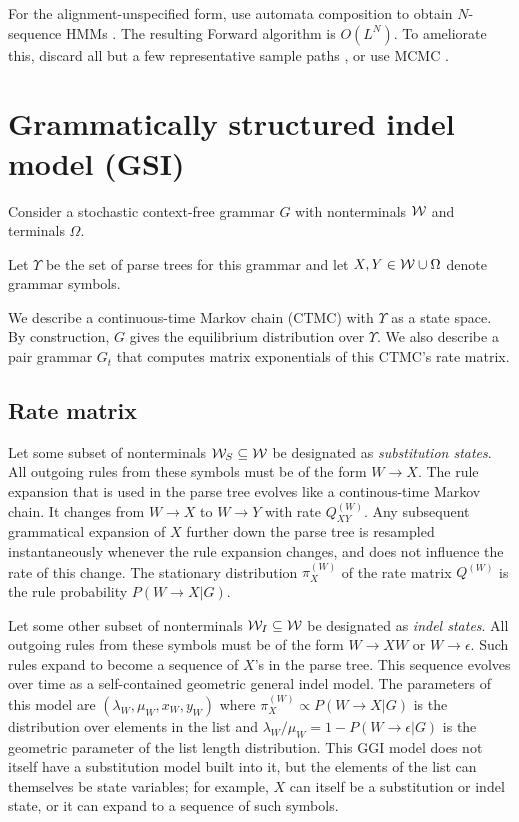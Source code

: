\documentclass{article}
\begin{document}
For the alignment-unspecified form, use automata composition to obtain $N$-sequence HMMs \cite{SilvestreRyanEtAl2020}.
The resulting Forward algorithm is $O(L^N)$.
To ameliorate this, discard all but a few representative sample paths \cite{WestessonEtAl2012},
or use MCMC \cite{RedelingsSuchard2007}.


\section{Grammatically structured indel model (GSI)}

Consider a stochastic context-free grammar $G$
with nonterminals ${\cal W}$ and terminals $\Omega$.

Let $\Upsilon$ be the set of parse trees for this grammar
and let $X,Y \in {\cal W}\cup\Omega$ denote grammar symbols.

We describe a continuous-time Markov chain (CTMC) with $\Upsilon$ as a state space.
By construction, $G$ gives the equilibrium distribution over $\Upsilon$.
We also describe a pair grammar $G_t$ that computes matrix exponentials of this CTMC's rate matrix.

\subsection{Rate matrix}

Let some subset of nonterminals ${\cal W}_S \subseteq {\cal W}$ be designated as {\em substitution states}.
All outgoing rules from these symbols must be of the form $W \to X$.
The rule expansion that is used in the parse tree evolves like a continous-time Markov chain.
It changes from $W \to X$ to $W \to Y$ with rate $Q^{(W)}_{XY}$.
Any subsequent grammatical expansion of $X$ further down the parse tree
is resampled instantaneously whenever the rule expansion changes,
and does not influence the rate of this change.
The stationary distribution $\pi^{(W)}_X$ of the rate matrix $Q^{(W)}$ is the rule probability $P(W \to X|G)$.

Let some other subset of nonterminals ${\cal W}_I \subseteq {\cal W}$ be designated as {\em indel states}.
All outgoing rules from these symbols must be of the form $W \to X W$ or $W \to \epsilon$.
Such rules expand to become a sequence of $X$'s in the parse tree.
This sequence evolves over time as a self-contained geometric general indel model.
The parameters of this model are $(\lambda_W, \mu_W, x_W, y_W)$
where $\pi^{(W)}_X \propto P(W \to X|G)$ is the distribution over elements in the list
and $\lambda_W / \mu_W = 1 - P(W \to \epsilon|G)$ is the geometric parameter of the list length distribution.
This GGI model does not itself have a substitution model built into it,
but the elements of the list can themselves be state variables;
for example, $X$ can itself be a substitution or indel state,
or it can expand to a sequence of such symbols.
\end{document}
